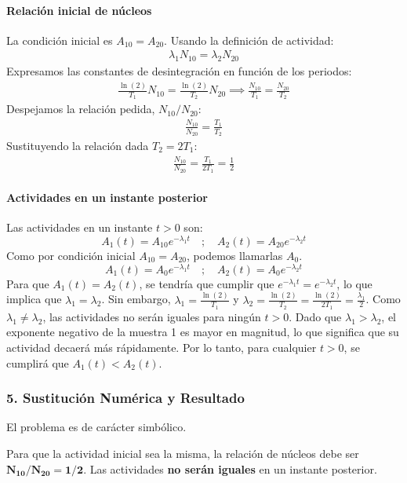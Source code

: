 \paragraph{Relación inicial de núcleos}
La condición inicial es $A_{10} = A_{20}$. Usando la definición de actividad:
\begin{gather}
    \lambda_1 N_{10} = \lambda_2 N_{20}
\end{gather}
Expresamos las constantes de desintegración en función de los periodos:
\begin{gather}
    \frac{\ln(2)}{T_1} N_{10} = \frac{\ln(2)}{T_2} N_{20} \implies \frac{N_{10}}{T_1} = \frac{N_{20}}{T_2}
\end{gather}
Despejamos la relación pedida, $N_{10}/N_{20}$:
\begin{gather}
    \frac{N_{10}}{N_{20}} = \frac{T_1}{T_2}
\end{gather}
Sustituyendo la relación dada $T_2 = 2T_1$:
\begin{gather}
    \frac{N_{10}}{N_{20}} = \frac{T_1}{2T_1} = \frac{1}{2}
\end{gather}

\paragraph{Actividades en un instante posterior}
Las actividades en un instante $t>0$ son:
$$ A_1(t) = A_{10}e^{-\lambda_1 t} \quad ; \quad A_2(t) = A_{20}e^{-\lambda_2 t} $$
Como por condición inicial $A_{10} = A_{20}$, podemos llamarlas $A_0$.
$$ A_1(t) = A_0 e^{-\lambda_1 t} \quad ; \quad A_2(t) = A_0 e^{-\lambda_2 t} $$
Para que $A_1(t) = A_2(t)$, se tendría que cumplir que $e^{-\lambda_1 t} = e^{-\lambda_2 t}$, lo que implica que $\lambda_1 = \lambda_2$.
Sin embargo, $\lambda_1 = \frac{\ln(2)}{T_1}$ y $\lambda_2 = \frac{\ln(2)}{T_2} = \frac{\ln(2)}{2T_1} = \frac{\lambda_1}{2}$.
Como $\lambda_1 \neq \lambda_2$, las actividades no serán iguales para ningún $t>0$.
Dado que $\lambda_1 > \lambda_2$, el exponente negativo de la muestra 1 es mayor en magnitud, lo que significa que su actividad decaerá más rápidamente. Por lo tanto, para cualquier $t>0$, se cumplirá que $A_1(t) < A_2(t)$.

\subsubsection*{5. Sustitución Numérica y Resultado}
El problema es de carácter simbólico.
\begin{cajaresultado}
Para que la actividad inicial sea la misma, la relación de núcleos debe ser $\boldsymbol{N_{10}/N_{20} = 1/2}$.
Las actividades \textbf{no serán iguales} en un instante posterior.
\end{cajaresultado}

